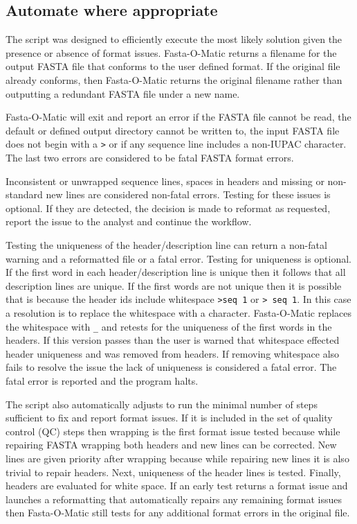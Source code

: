 \documentclass{bmcart}
\begin{document}
\subsection{Automate where appropriate} 

The script was designed to efficiently execute the most likely solution given the presence or absence of format issues. Fasta-O-Matic returns a filename for the output FASTA file that conforms to the user defined format. If the original file already conforms, then Fasta-O-Matic returns the original filename rather than outputting a redundant FASTA file under a new name.

Fasta-O-Matic will exit and report an error if the FASTA file cannot be read, the default or defined output directory cannot be written to, the input FASTA file does not begin with a \verb|>| or if any sequence line includes a non-IUPAC character. The last two errors are considered to be fatal FASTA format errors.

Inconsistent or unwrapped sequence lines, spaces in headers and missing or non-standard new lines are considered non-fatal errors. Testing for these issues is optional. If they are detected, the decision is made to reformat as requested, report the issue to the analyst and continue the workflow.

Testing the uniqueness of the header/description line can return a non-fatal warning and a reformatted file or a fatal error. Testing for uniqueness is optional. If the first word in each header/description line is unique then it follows that all description lines are unique. If the first words are not unique then it is possible that is because the header ids include whitespace \verb|>seq 1| or \verb|> seq 1|. In this case a resolution is to replace the whitespace with a character. Fasta-O-Matic replaces the whitespace with \verb|_| and retests for the uniqueness of the first words in the headers. If this version passes than the user is warned that whitespace effected header uniqueness and was removed from headers. If removing whitespace also fails to resolve the issue the lack of uniqueness is considered a fatal error. The fatal error is reported and the program halts.

The script also automatically adjusts to run the minimal number of steps sufficient to fix and report format issues. If it is included in the set of quality control (QC) steps then wrapping is the first format issue tested because while repairing FASTA wrapping both headers and new lines can be corrected. New lines are given priority after wrapping because while repairing new lines it is also trivial to repair headers. Next, uniqueness of the header lines is tested. Finally, headers are evaluated for white space. If an early test returns a format issue and launches a reformatting that automatically repairs any remaining format issues then Fasta-O-Matic still tests for any additional format errors in the original file. 
\end{document}
